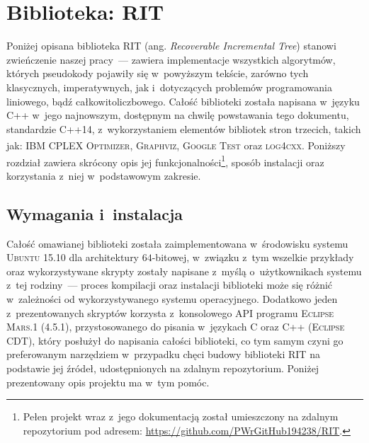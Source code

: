 \chapter{Biblioteka: RIT}
\label{app:takeMeHome}
\thispagestyle{appendixStyle}





Poniżej opisana biblioteka \textsc{RIT} (ang. \textit{Recoverable Incremental Tree}) stanowi zwieńczenie naszej pracy~--- zawiera implementacje wszystkich algorytmów, których pseudokody pojawiły się w~powyższym tekście, zarówno tych klasycznych, imperatywnych, jak i~dotyczących problemów programowania liniowego, bądź całkowitoliczbowego.
Całość biblioteki została napisana w~języku \textsc{C++} w~jego najnowszym, dostępnym na chwilę powstawania tego dokumentu, standardzie \textsc{C++14}, z~wykorzystaniem elementów bibliotek stron trzecich, takich jak: \textsc{IBM\textsuperscript{\textregistered} CPLEX\textsuperscript{\textregistered} Optimizer}, \textsc{Graphviz}, \textsc{Google Test} oraz \textsc{log4cxx}.
Poniższy rozdział zawiera skrócony opis jej funkcjonalności\footnote{
	Pełen projekt wraz z~jego dokumentacją został umieszczony na zdalnym repozytorium pod adresem: \url{https://github.com/PWrGitHub194238/RIT}.
}, sposób instalacji oraz korzystania z~niej w~podstawowym zakresie.




\section{Wymagania i~instalacja}




Całość omawianej biblioteki została zaimplementowana w~środowisku systemu \textsc{Ubuntu 15.10} dla architektury $64$-bitowej, w~związku z~tym wszelkie przykłady oraz wykorzystywane skrypty zostały napisane z~myślą o~użytkownikach systemu z~tej rodziny~--- proces kompilacji oraz instalacji biblioteki może się różnić w~zależności od wykorzystywanego systemu operacyjnego.
Dodatkowo jeden z~prezentowanych skryptów korzysta z~konsolowego \textsc{API} programu \textsc{Eclipse Mars.1 (4.5.1)}, przystosowanego do pisania w~językach \textsc{C} oraz \textsc{C++} (\textsc{Eclipse CDT}), który posłużył do napisania całości biblioteki, co tym samym czyni go preferowanym narzędziem w~przypadku chęci budowy biblioteki \textsc{RIT} na podstawie jej źródeł, udostępnionych na zdalnym repozytorium.
Poniżej prezentowany opis projektu ma w~tym pomóc. 



